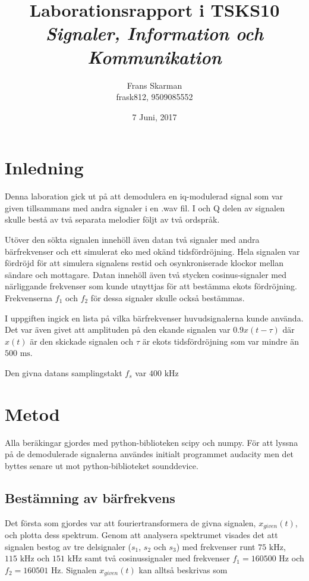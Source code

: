 \documentclass[10pt,twocolumn]{article}
\title{Laborationsrapport i TSKS10 \emph{Signaler, Information och Kommunikation}}
\author{Frans Skarman \\ frask812, 9509085552 }
\date{7 Juni, 2017}
\newcommand{\echodelay}{\tau}
\begin{document}
\maketitle

\section{Inledning}

Denna laboration gick ut på att demodulera en iq-modulerad signal som var given
tillsammans med andra signaler i en .wav fil. I och Q delen av signalen skulle
bestå av två separata melodier följt av två ordspråk.

Utöver den sökta signalen innehöll även datan två signaler med andra bärfrekvenser
och ett simulerat eko med okänd tidsfördröjning. Hela signalen var fördröjd
för att simulera signalens restid och osynkroniserade klockor mellan sändare och mottagare.
Datan innehöll
även två stycken cosinus-signaler med närliggande frekvenser som kunde utnyttjas för
att bestämma ekots fördröjning. Frekvenserna $f_1$ och $f_2$ för dessa signaler 
skulle också bestämmas.

I uppgiften ingick en lista på vilka bärfrekvenser huvudsignalerna kunde använda.
Det var även givet att amplituden på den ekande signalen var $0.9 x(t-\echodelay)$
där $x(t)$ är den skickade signalen och $\echodelay$ är ekots tidsfördröjning som var
mindre än $500 \text{ ms}$.

Den givna datans samplingstakt $f_s$ var $400 \text{ kHz}$



\section{Metod}


Alla beräkingar gjordes med python-biblioteken scipy och numpy. För att lyssna på de demodulerade
signalerna användes initialt programmet audacity men det byttes senare ut mot python-biblioteket
sounddevice.

\subsection{Bestämning av bärfrekvens}

Det första som gjordes var att fouriertransformera de givna signalen, $x_{given}(t)$, och plotta
dess spektrum. Genom att analysera spektrumet visades det att signalen bestog av tre
delsignaler ($s_1$, $s_2$ och $s_3$) med frekvenser runt $75 \text{ kHz}$, 
$115 \text{ kHz}$ och $151 \text{ kHz}$ samt två
cosinussignaler med frekvenser $f_1 = 160500 \text{ Hz}$ och $f_2 = 160501 \text{ Hz}$.
Signalen $x_{given}(t)$ kan alltså beskrivas som
\end{document}
